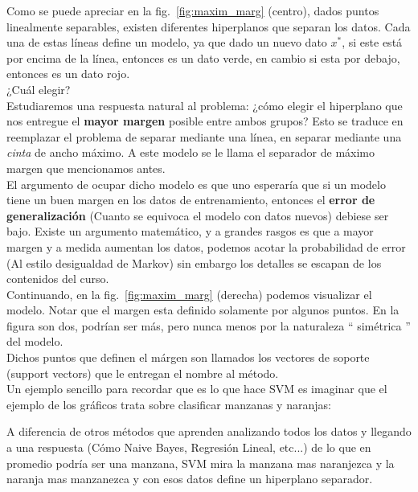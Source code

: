 Como se puede apreciar en la fig.~\ref{fig:maxim_marg} (centro), dados puntos linealmente separables, existen diferentes hiperplanos que separan los datos. Cada una de estas líneas define un modelo, ya que dado un nuevo dato $x^*$, si este está por encima de la línea, entonces es un dato verde, en cambio si esta por debajo, entonces es un dato rojo. 
\\

¿Cuál elegir?
\\

Estudiaremos una respuesta natural al problema: ¿cómo elegir el hiperplano que nos entregue el \textbf{mayor margen} posible entre ambos grupos? Esto se traduce en reemplazar el problema de separar mediante una línea, en separar mediante una \emph{cinta} de ancho máximo. A este modelo se le llama el separador de máximo margen que mencionamos antes. 
\\

El argumento de ocupar dicho modelo es que uno esperaría que si un modelo tiene un buen margen en los datos de entrenamiento, entonces el \textbf{error de generalización} (Cuanto se equivoca el modelo con datos nuevos) debiese ser bajo. Existe un argumento matemático, y a grandes rasgos es que a mayor margen y a medida aumentan los datos,  podemos acotar la probabilidad de error (Al estilo desigualdad de Markov) sin embargo los detalles se escapan de los contenidos del curso.  
\\

Continuando, en la fig.~\ref{fig:maxim_marg} (derecha) podemos visualizar el modelo. Notar que el  margen esta definido solamente por algunos puntos. En la figura son dos, podrían ser más, pero nunca menos por la naturaleza `` simétrica '' del modelo.
\\

Dichos puntos que definen el márgen son llamados los vectores de soporte (support vectors) que le entregan el nombre al método. 
\\

Un ejemplo sencillo para recordar que es lo que hace SVM es imaginar que el ejemplo de los gráficos trata sobre clasificar manzanas y naranjas: 


A diferencia de otros métodos que aprenden analizando todos los datos y llegando a una respuesta (Cómo Naive Bayes, Regresión Lineal, etc...) de lo que en promedio podría ser una manzana, SVM mira la manzana mas naranjezca y la naranja mas manzanezca y con esos datos define un hiperplano separador. 



